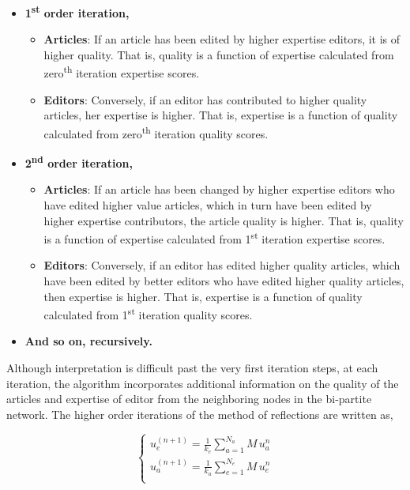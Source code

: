 \begin{itemize}
  \item {\bf 1\textsuperscript{st} order iteration,}  
  \begin{itemize}
  \item {\bf Articles}: If an article has been edited by higher expertise editors, it is of higher quality. That is, quality is a function of expertise calculated from zero\textsuperscript{th} iteration expertise scores.
  \item {\bf Editors}: Conversely, if an editor has contributed to higher quality articles, her expertise is higher. That is, expertise is a function of quality calculated from zero\textsuperscript{th} iteration quality scores.
  \end{itemize}
  \item {\bf 2\textsuperscript{nd} order iteration,}
    \begin{itemize}
  \item {\bf Articles}: If an article has been changed by higher expertise editors who have edited higher value articles, which in turn have been edited by higher expertise contributors, the article quality is higher. That is, quality is a function of expertise calculated from 1\textsuperscript{st} iteration expertise scores.
  \item {\bf Editors}: Conversely, if an editor has edited higher quality articles, which have been edited by better editors who have edited higher quality articles, then expertise is higher. That is, expertise is a function of quality calculated from 1\textsuperscript{st} iteration quality scores.
  \end{itemize}
 \item {\bf And so on, recursively.}\\
\end{itemize}

Although interpretation is difficult past the very first iteration steps, at each iteration, the algorithm incorporates additional information on the quality of the articles and expertise of editor from the neighboring nodes in the bi-partite network. The higher order iterations of the method of reflections are written as,

\begin{equation}
\begin{cases}
 u_{e}^{(n+1)} = \frac{1}{k_{e}}\sum_{a=1}^{N_{a}} M \, u_{a}^{n}\\[7pt]
 u_{a}^{(n+1)} = \frac{1}{k_{a}}\sum_{e=1}^{N_{e}} M \, u_{e}^{n}\\
\end{cases}
\label{HHhigher}
\end{equation}

